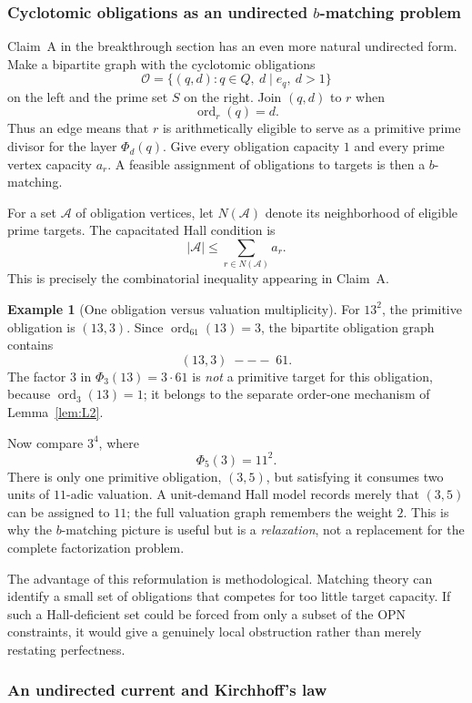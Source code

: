 \documentclass[11pt]{article}
\theoremstyle{definition}
\newtheorem{example}[theorem]{Example}
\theoremstyle{remark}
\DeclareMathOperator{\ord}{ord}
\begin{document}
\subsubsection{Cyclotomic obligations as an undirected $b$-matching problem}

Claim~A in the breakthrough section has an even more natural undirected form.
Make a bipartite graph with the cyclotomic obligations
\[
\mathcal O=\{(q,d):q\in Q,\ d\mid e_q,\ d>1\}
\]
on the left and the prime set $S$ on the right.  Join $(q,d)$ to $r$ when
\[
\ord_r(q)=d.
\]
Thus an edge means that $r$ is arithmetically eligible to serve as a primitive
prime divisor for the layer $\Phi_d(q)$.  Give every obligation capacity $1$
and every prime vertex capacity $a_r$.  A feasible assignment of obligations
to targets is then a $b$-matching.

For a set $\mathcal A$ of obligation vertices, let $N(\mathcal A)$ denote its
neighborhood of eligible prime targets.  The capacitated Hall condition is
\[
\boxed{
|\mathcal A|\le \sum_{r\in N(\mathcal A)}a_r.
}
\]
This is precisely the combinatorial inequality appearing in Claim~A.

\begin{example}[One obligation versus valuation multiplicity]
For $13^2$, the primitive obligation is $(13,3)$.  Since
$\ord_{61}(13)=3$, the bipartite obligation graph contains
\[
(13,3)\;---\;61.
\]
The factor $3$ in $\Phi_3(13)=3\cdot61$ is \emph{not} a primitive target for
this obligation, because $\ord_3(13)=1$; it belongs to the separate
order-one mechanism of Lemma~\ref{lem:L2}.

Now compare $3^4$, where
\[
\Phi_5(3)=11^2.
\]
There is only one primitive obligation, $(3,5)$, but satisfying it consumes
two units of $11$-adic valuation.  A unit-demand Hall model records merely
that $(3,5)$ can be assigned to $11$; the full valuation graph remembers the
weight $2$.  This is why the $b$-matching picture is useful but is a
\emph{relaxation}, not a replacement for the complete factorization problem.
\end{example}

The advantage of this reformulation is methodological.  Matching theory can
identify a small set of obligations that competes for too little target
capacity.  If such a Hall-deficient set could be forced from only a subset of
the OPN constraints, it would give a genuinely local obstruction rather than
merely restating perfectness.

\subsubsection{An undirected current and Kirchhoff's law}
\end{document}
